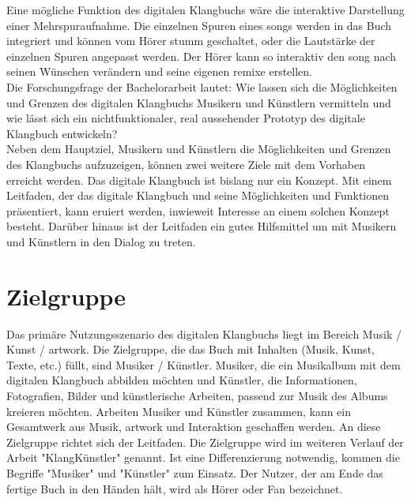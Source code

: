 Eine mögliche Funktion des digitalen Klangbuchs wäre die interaktive Darstellung einer Mehrspuraufnahme. Die einzelnen Spuren eines \gls{song}s werden in das Buch integriert und können vom Hörer stumm geschaltet, oder die Lautstärke der einzelnen Spuren angepasst werden. Der Hörer kann so interaktiv den \gls{song} nach seinen Wünschen verändern und seine eigenen \gls{remix}e erstellen.\\

Die Forschungsfrage der Bachelorarbeit lautet: Wie lassen sich die Möglichkeiten und Grenzen des digitalen Klangbuchs Musikern und Künstlern vermitteln und wie lässt sich ein nichtfunktionaler, real aussehender Prototyp des digitale Klangbuch entwickeln?\\

Neben dem Hauptziel, Musikern und Künstlern die Möglichkeiten und Grenzen des Klangbuchs aufzuzeigen, können zwei weitere Ziele mit dem Vorhaben erreicht werden. Das digitale Klangbuch ist bislang nur ein Konzept. Mit einem Leitfaden, der das digitale Klangbuch und seine Möglichkeiten und Funktionen präsentiert, kann eruiert werden, inwieweit Interesse an einem solchen Konzept besteht. Darüber hinaus ist der Leitfaden ein gutes Hilfsmittel um mit Musikern und Künstlern in den Dialog zu treten.




\section{{Zielgruppe}}\label{einleitung_zielgruppe}
Das primäre Nutzungsszenario des digitalen Klangbuchs liegt im Bereich Musik / Kunst / \gls{artwork}. Die Zielgruppe, die das Buch mit Inhalten (Musik, Kunst, Texte, etc.) füllt, sind Musiker / Künstler. Musiker, die ein Musikalbum mit dem digitalen Klangbuch abbilden möchten und Künstler, die Informationen, Fotografien, Bilder und künstlerische Arbeiten, passend zur Musik des Albums kreieren möchten. Arbeiten Musiker und Künstler zusammen, kann ein Gesamtwerk aus Musik, \gls{artwork} und Interaktion geschaffen werden. An diese Zielgruppe richtet sich der Leitfaden. Die Zielgruppe wird im weiteren Verlauf der Arbeit "KlangKünstler" genannt. Ist eine Differenzierung notwendig, kommen die Begriffe "Musiker" und "Künstler" zum Einsatz. Der Nutzer, der am Ende das fertige Buch in den Händen hält, wird als Hörer oder Fan bezeichnet.\\








